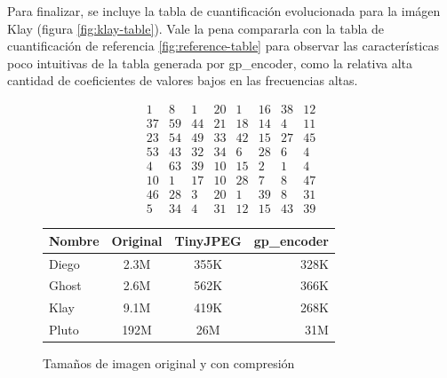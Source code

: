 Para finalizar, se incluye la tabla de cuantificación evolucionada para la
imágen Klay (figura \ref{fig:klay-table}). Vale la pena compararla con la tabla de
cuantificación de referencia \ref{fig:reference-table} para observar las
características poco intuitivas de la tabla generada por gp\_encoder, como la
relativa alta cantidad de coeficientes de valores bajos en las frecuencias
altas.


\begin{equation}
    \begin{matrix}
        1  &   8  &  1  & 20  &  1  & 16  & 38  & 12 \\
        37 &   59 &  44 &  21 &  18 &  14 &   4 &  11 \\
        23 &   54 &  49 &  33 &  42 &  15 &  27 &  45 \\
        53 &   43 &  32 &  34 &   6 &  28 &   6 &   4 \\
        4  &  63  & 39  & 10  & 15  &  2  &  1  &  4 \\
        10 &    1 &  17 &  10 &  28 &   7 &   8 &  47 \\
        46 &   28 &   3 &  20 &   1 &  39 &   8 &  31 \\
        5  &  34  &  4  & 31  & 12  & 15  & 43  & 39
    \end{matrix}
    \label{fig:klay-table}
\end{equation}

\begin{figure}[h]
    \begin{tabular}{|l c c r|}
        \hline
        Nombre & Original & TinyJPEG & gp\_encoder \\
        \hline
        Diego & 2.3M & 355K & 328K \\
        Ghost & 2.6M & 562K & 366K \\
        Klay  & 9.1M & 419K & 268K \\
        Pluto & 192M & 26M & 31M  \\
        \hline
    \end{tabular}
    \caption{Tamaños de imagen original y con compresión}
    \label{fig:size-table}
\end{figure}


